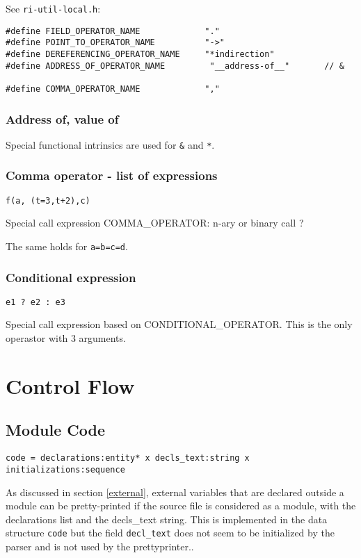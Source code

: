 \documentclass[a4paper]{report}
\begin{document}
See \verb/ri-util-local.h/:
\begin{verbatim}
#define FIELD_OPERATOR_NAME             "."
#define POINT_TO_OPERATOR_NAME          "->"
#define DEREFERENCING_OPERATOR_NAME     "*indirection"
#define ADDRESS_OF_OPERATOR_NAME         "__address-of__"       // &

#define COMMA_OPERATOR_NAME             ","
\end{verbatim}

\subsection{Address of, value of}

Special functional intrinsics are used for \verb/&/ and \texttt{*}.

\subsection{Comma operator - list of expressions}

\lstinline|f(a, (t=3,t+2),c)|

Special call expression COMMA\_OPERATOR: n-ary or binary call ?

The same holds for \lstinline/a=b=c=d/. 

\subsection{Conditional expression}

\lstinline|e1 ? e2 : e3 |

Special call expression based on CONDITIONAL\_OPERATOR. This is the
only operastor with 3 arguments.


\chapter{Control Flow}
\label{chapter:control-flow}

\section{Module Code}

\verb/code = declarations:entity* x decls_text:string x initializations:sequence/

As discussed in section \ref{external}, external variables that are
declared outside a module can be pretty-printed if the source file is
considered as a module, with the declarations list and the decls\_text
string. This is implemented in the data structure \verb/code/ but the
field \verb/decl_text/ does not seem to be initialized by the parser
and is not used by the prettyprinter..
\end{document}

